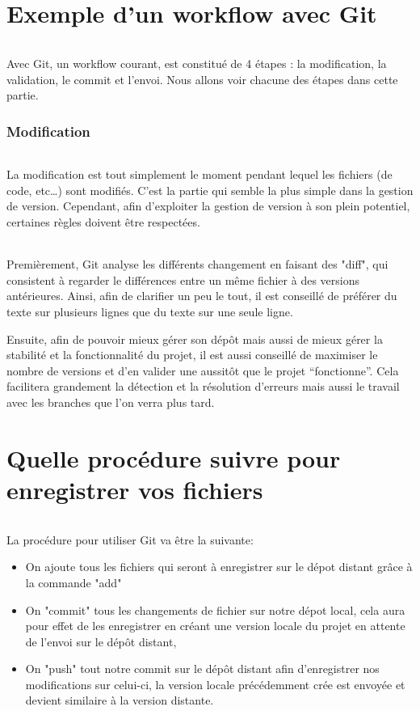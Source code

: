 \documentclass[french, a4paper, 12pt, titlepage]{article}
\begin{document}
\newpage
\part{Exemple d'un workflow avec Git}
\paragraph{} Avec Git, un workflow courant, est constitué de 4 étapes : la modification, la validation, le commit et l'envoi. Nous allons voir chacune des étapes dans cette partie.
\section{Modification}
\paragraph{}La modification est tout simplement le moment pendant lequel les fichiers (de code, etc\dots) sont modifiés. C'est la partie qui semble la plus simple dans la gestion de version. Cependant, afin d'exploiter la gestion de version à son plein potentiel, certaines règles doivent être respectées.
\paragraph{}Premièrement, Git analyse les différents changement en faisant des "diff", qui consistent à regarder le différences entre un même fichier à des versions antérieures. Ainsi, afin de clarifier un peu le tout, il est conseillé de préférer du texte sur plusieurs lignes que du texte sur une seule ligne.

Ensuite, afin de pouvoir mieux gérer son dépôt mais aussi de mieux gérer la stabilité et la fonctionnalité du projet, il est aussi conseillé de maximiser le nombre de versions et d'en valider une aussitôt que le projet ``fonctionne''. Cela facilitera grandement la détection et la résolution d'erreurs mais aussi le travail avec les branches que l'on verra plus tard.


\newpage
\part{Quelle procédure suivre pour enregistrer vos fichiers}
\paragraph{}La procédure pour utiliser Git va être la suivante:
\begin{itemize}
\item On ajoute tous les fichiers qui seront à enregistrer sur le dépot distant grâce à la commande "add"
\item On "commit" tous les changements de fichier sur notre dépot local, cela aura pour effet de les enregistrer en créant une version locale du projet en attente de l'envoi sur le dépôt distant,
\item On "push" tout notre commit sur le dépôt distant afin d'enregistrer nos modifications sur celui-ci, la version locale précédemment crée est envoyée et devient similaire à la version distante.
\end{itemize}
\end{document}
